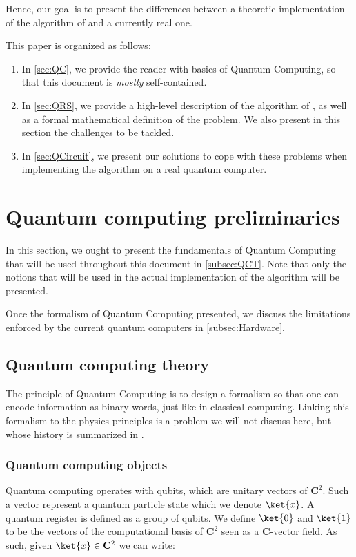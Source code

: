\documentclass[11pt, a4paper]{article}
\begin{document}
        Hence, our goal is to present the differences between a theoretic implementation of the algorithm of \citeauthor{QRS} and a currently real one.
        
        This paper is organized as follows:
        
        \begin{enumerate}
         \item In \autoref{sec:QC}, we provide the reader with basics of Quantum Computing, so that this document is \textit{mostly} self-contained.
         \item In \autoref{sec:QRS}, we provide a high-level description of the algorithm of \citeauthor{QRS}, as well as a formal mathematical definition of the problem. We also present in this section the challenges to be tackled.
         \item In \autoref{sec:QCircuit}, we present our solutions to cope with these problems when implementing the algorithm on a real quantum computer.
        \end{enumerate}

    \section{Quantum computing preliminaries}
        \label{sec:QC}
        In this section, we ought to present the fundamentals of Quantum Computing that will be used throughout this document in \autoref{subsec:QCT}. Note that only the notions that will be used in the actual implementation of the algorithm will be presented.
        
        Once the formalism of Quantum Computing presented, we discuss the limitations enforced by the current quantum computers in \autoref{subsec:Hardware}.
        \subsection{Quantum computing theory}
            \label{subsec:QCT}
            The principle of Quantum Computing is to design a formalism so that one can encode information as binary words, just like in classical computing. Linking this formalism to the physics principles is a problem we will not discuss here, but whose history is summarized in \cite{HistoryEquivalence}.
            \subsubsection{Quantum computing objects}
                Quantum computing operates with qubits, which are unitary vectors of \(\mathbf{C}^2\). Such a vector represent a quantum particle state which we denote \(\ket{x}\). A quantum register is defined as a group of qubits. We define \(\ket{0}\) and \(\ket{1}\) to be the vectors of the computational basis of \(\mathbf{C}^2\) seen as a \(\mathbf{C}\)-vector field. As such, given \(\ket{x}\in\mathbf{C}^2\) we can write:
                
\end{document}
